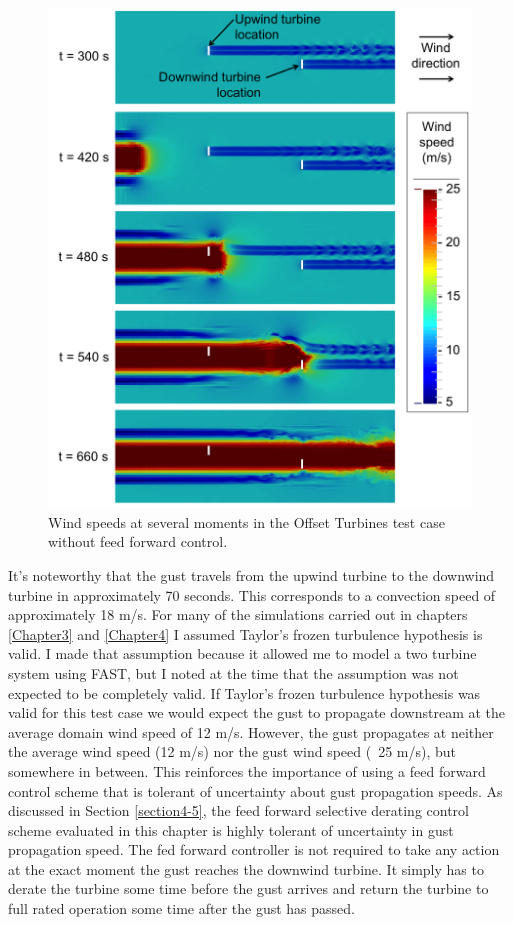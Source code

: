  
 \begin{figure}[hp]  
	\centering
		\includegraphics[width = \linewidth]{Figures/ch6Figures/fig6-14.png}

	\caption{Wind speeds at several moments in the Offset Turbines test case without feed forward control.}
	\label{fig6-14}
\end{figure}

It's noteworthy that the gust travels from the upwind turbine to the downwind turbine in approximately 70 seconds. This corresponds to a convection speed of approximately 18 m/s. For many of the simulations carried out in chapters \ref{Chapter3} and \ref{Chapter4} I assumed Taylor's frozen turbulence hypothesis is valid. I made that assumption because it allowed me to model a two turbine system using FAST, but I noted at the time that the assumption was not expected to be completely valid. If Taylor's frozen turbulence hypothesis was valid for this test case we would expect the gust to propagate downstream at the average domain wind speed of 12 m/s. However, the gust propagates at neither the average wind speed (12 m/s) nor the gust wind speed (~25 m/s), but somewhere in between. This reinforces the importance of using a feed forward control scheme that is tolerant of uncertainty about gust propagation speeds. As discussed in Section \ref{section4-5}, the feed forward selective derating control scheme evaluated in this chapter is highly tolerant of uncertainty in gust propagation speed. The fed forward controller is not required to take any action at the exact moment the gust reaches the downwind turbine. It simply has to derate the turbine some time before the gust arrives and return the turbine to full rated operation some time after the gust has passed.

